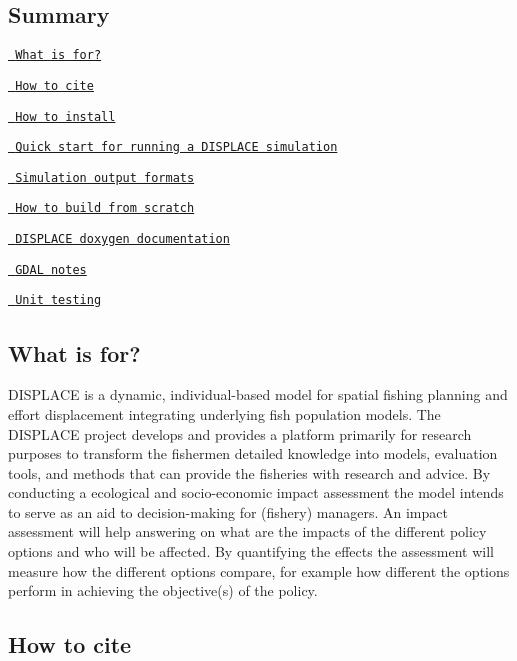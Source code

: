 \subsection*{Summary}


\begin{DoxyItemize}
\item \href{\#what-is-for}{\texttt{ What is for?}}
\item \href{\#how-to-cite}{\texttt{ How to cite}}
\item \href{\#how-to-install}{\texttt{ How to install}}
\item \href{\#quick-start-for-running-a-displace-simulation}{\texttt{ Quick start for running a D\+I\+S\+P\+L\+A\+CE simulation}}
\item \href{\#simulation-output-formats}{\texttt{ Simulation output formats}}
\item \href{\#how-to-build-from-scratch}{\texttt{ How to build from scratch}}
\item \href{\#displace-doxygen-documentation}{\texttt{ D\+I\+S\+P\+L\+A\+CE doxygen documentation}}
\item \href{\#gdal-notes}{\texttt{ G\+D\+AL notes}}
\item \href{\#unit-testing}{\texttt{ Unit testing}}
\end{DoxyItemize}

\subsection*{What is for?}

D\+I\+S\+P\+L\+A\+CE is a dynamic, individual-\/based model for spatial fishing planning and effort displacement integrating underlying fish population models. The D\+I\+S\+P\+L\+A\+CE project develops and provides a platform primarily for research purposes to transform the fishermen detailed knowledge into models, evaluation tools, and methods that can provide the fisheries with research and advice. By conducting a ecological and socio-\/economic impact assessment the model intends to serve as an aid to decision-\/making for (fishery) managers. An impact assessment will help answering on what are the impacts of the different policy options and who will be affected. By quantifying the effects the assessment will measure how the different options compare, for example how different the options perform in achieving the objective(s) of the policy.

\subsection*{How to cite}


